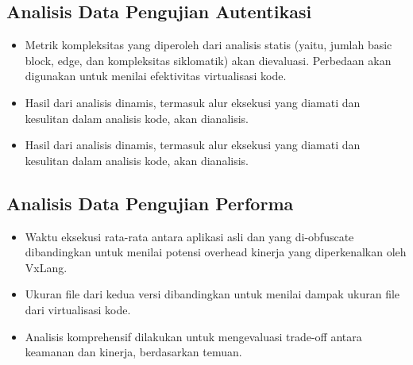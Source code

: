\subsection{Analisis Data Pengujian Autentikasi}
\begin{itemize}
	\item {} Metrik kompleksitas yang diperoleh dari analisis statis (yaitu, jumlah basic block, edge, dan kompleksitas siklomatik) akan dievaluasi. Perbedaan akan digunakan untuk menilai efektivitas virtualisasi kode.
	\item {} Hasil dari analisis dinamis, termasuk alur eksekusi yang diamati dan kesulitan dalam analisis kode, akan dianalisis.
	\item {} Hasil dari analisis dinamis, termasuk alur eksekusi yang diamati dan kesulitan dalam analisis kode, akan dianalisis.
\end{itemize}

\subsection{Analisis Data Pengujian Performa}
\begin{itemize}
	\item {} Waktu eksekusi rata-rata antara aplikasi asli dan yang di-obfuscate dibandingkan untuk menilai potensi overhead kinerja yang diperkenalkan oleh VxLang.
	\item {} Ukuran file dari kedua versi dibandingkan untuk menilai dampak ukuran file dari virtualisasi kode.
	\item {} Analisis komprehensif dilakukan untuk mengevaluasi trade-off antara keamanan dan kinerja, berdasarkan temuan.
\end{itemize}

